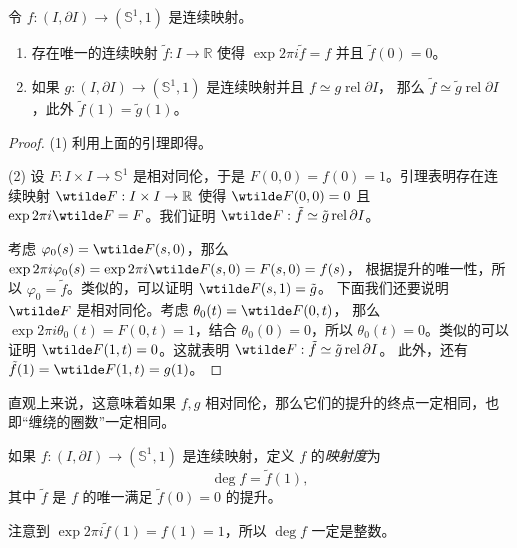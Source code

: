 \documentclass[fontset=none]{Notes}
\DeclareMathOperator\rel{rel}
\newcommand{\partI}{\partial I}
\newcommand{\relhomo}{\rel\partI}
\begin{document}
\begin{corollary}\label{coro:lift of path}
  令 $f:(I,\partI)\to (\mathbb{S}^1,1)$ 是连续映射。
  \begin{enumerate}
    \item 存在唯一的连续映射 $\tilde{f}:I\to \mathbb{R}$ 使得 $\exp 2\pi i \tilde{f}=f$
    并且 $\tilde{f}(0)=0$。
    \item 如果 $g:(I,\partI)\to (\mathbb{S}^1,1)$ 是连续映射并且 $f\simeq g\relhomo$，
    那么 $\tilde{f}\simeq \tilde{g}\relhomo$，此外 $\tilde{f}(1)=\tilde{g}(1)$。
  \end{enumerate}
\end{corollary}
\begin{proof}
  (1) 利用上面的引理即得。

  (2) 设 $F:I\times I\to \mathbb{S}^1$ 是相对同伦，于是 $F(0,0)=f(0)=1$。引理表明存在连续映射 $\wtilde F:I\times I\to \mathbb{R}$
  使得 $\wtilde F(0,0)=0$ 且 $\exp 2\pi i \wtilde F=F$。我们证明 $\wtilde F:\tilde f\simeq \tilde g\relhomo$。

  考虑 $\varphi_0(s)=\wtilde F(s,0)$，那么  $\exp 2\pi i\varphi_0(s)=\exp 2\pi i\wtilde F(s,0)=F(s,0)=f(s)$，
  根据提升的唯一性，所以 $\varphi_0=\tilde f$。类似的，可以证明 $\wtilde F(s,1)=\tilde g$。
  下面我们还要说明 $\wtilde F$ 是相对同伦。考虑 $\theta_0(t)=\wtilde F(0,t)$，
  那么 $\exp 2\pi i \theta_0(t)=F(0,t)=1$，结合 $\theta_0(0)=0$，所以
  $\theta_0(t)=0$。类似的可以证明 $\wtilde F(1,t)=0$。这就表明 $\wtilde F:\tilde f\simeq \tilde g\relhomo$。
  此外，还有 $\tilde f(1)=\wtilde F(1,t)=g(1)$。
\end{proof}

直观上来说，这意味着如果 $f,g$ 相对同伦，那么它们的提升的终点一定相同，也即“缠绕的圈数”一定相同。

\begin{definition}
  如果 $f:(I,\partI)\to (\mathbb{S}^1,1)$ 是连续映射，定义 $f$ 的\emph{映射度}为
  \[
    \deg f=\tilde f(1),
  \]
  其中 $\tilde f$ 是 $f$ 的唯一满足 $\tilde f(0)=0$ 的提升。
\end{definition}

注意到 $\exp 2\pi i \tilde f(1)=f(1)=1$，所以 $\deg f$ 一定是整数。
\end{document}
